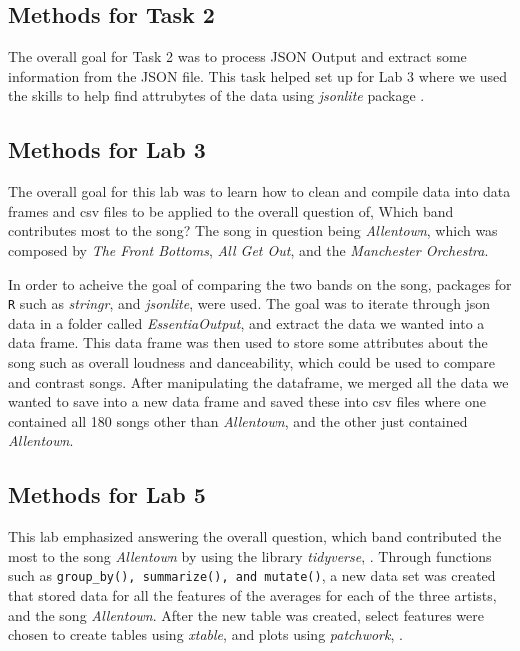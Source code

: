 \documentclass{article}\usepackage[]{graphicx}\usepackage[]{xcolor}
\begin{document}
\begin{multicols}{2}
\subsection{Methods for Task 2}
The overall goal for Task 2 was to process JSON Output and extract some information from the JSON file. This task helped set up for Lab 3 where we used the skills to help find attrubytes of the data using \emph{jsonlite} package \citep{jsonlite}.

\subsection{Methods for Lab 3}
The overall goal for this lab was to learn how to clean and compile data into data frames and csv files to be applied to the overall question of, Which band contributes most to the song? The song in question being \emph{Allentown}, which was composed by \emph{The Front Bottoms}, \emph{All Get Out}, and the \emph{Manchester Orchestra}. 

In order to acheive the goal of comparing the two bands on the song, packages for \texttt{R} such as \emph{stringr}, \citep{stringr} and \emph{jsonlite}, \citep{jsonlite} were used. The goal was to iterate through json data in a folder called \emph{EssentiaOutput}, and extract the data we wanted into a data frame. This data frame was then used to store some attributes about the song such as overall loudness and danceability, which could be used to compare and contrast songs. After manipulating the dataframe, we merged all the data we wanted to save into a new data frame and saved these into csv files where one contained all 180 songs other than \emph{Allentown}, and the other just contained \emph{Allentown}. 

\subsection{Methods for Lab 5}
This lab emphasized answering the overall question, which band contributed the most to the song \emph{Allentown} by using the library \emph{tidyverse}, \citep{tidyverse}. Through functions such as \texttt{group\_by(), summarize(), and mutate()}, a new data set was created that stored data for all the features of the averages for each of the three artists, and the song \emph{Allentown}. After the new table was created, select features were chosen to create tables using \emph{xtable},\citep{xtable} and plots using \emph{patchwork}, \citep{patchwork}.


\end{multicols}
\end{document}
